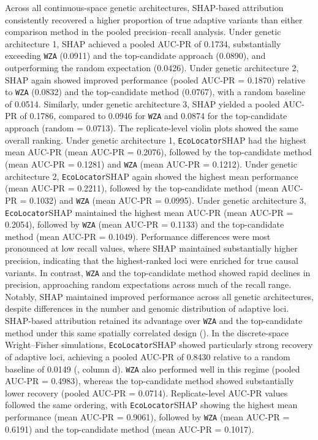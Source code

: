 \documentclass[]{article}
\newcommand{\ecolocator}{\texttt{EcoLocator}\xspace}
\begin{document}
Across all continuous-space genetic architectures,
SHAP-based attribution consistently recovered
a higher proportion of true adaptive variants
than either comparison method in the pooled precision--recall analysis.
Under genetic architecture 1,
SHAP achieved a pooled AUC-PR of 0.1734,
substantially exceeding \texttt{WZA} (0.0911)
and the top-candidate approach (0.0890),
and outperforming the random expectation (0.0426).
Under genetic architecture 2,
SHAP again showed improved performance
(pooled AUC-PR = 0.1870)
relative to \texttt{WZA} (0.0832)
and the top-candidate method (0.0767),
with a random baseline of 0.0514.
Similarly,
under genetic architecture 3,
SHAP yielded a pooled AUC-PR of 0.1786,
compared to 0.0946 for \texttt{WZA}
and 0.0874 for the top-candidate approach
(random = 0.0713).
The replicate-level violin plots showed the same overall ranking.
Under genetic architecture 1, 
\ecolocator\texttimes{}SHAP had the highest mean AUC-PR
(mean AUC-PR = 0.2076),
followed by the top-candidate method
(mean AUC-PR = 0.1281)
and \texttt{WZA}
(mean AUC-PR = 0.1212).
Under genetic architecture 2,
\ecolocator\texttimes{}SHAP again showed the highest mean performance
(mean AUC-PR = 0.2211),
followed by the top-candidate method
(mean AUC-PR = 0.1032)
and \texttt{WZA}
(mean AUC-PR = 0.0995).
Under genetic architecture 3,
\ecolocator\texttimes{}SHAP maintained the highest mean AUC-PR
(mean AUC-PR = 0.2054),
followed by \texttt{WZA}
(mean AUC-PR = 0.1133)
and the top-candidate method
(mean AUC-PR = 0.1049).
Performance differences were most pronounced
at low recall values,
where SHAP maintained substantially higher precision,
indicating that the highest-ranked loci
were enriched for true causal variants.
In contrast,
\texttt{WZA} and the top-candidate method showed rapid declines in precision,
approaching random expectations across much of the recall range.
Notably,
SHAP maintained improved performance
across all genetic architectures,
despite differences in the number
and genomic distribution of adaptive loci.
SHAP-based attribution retained its 
advantage over \texttt{WZA} and the top-candidate method under 
this same spatially correlated design ().
In the discrete-space Wright--Fisher simulations,
\ecolocator\texttimes{}SHAP showed particularly strong recovery
of adaptive loci,
achieving a pooled AUC-PR of 0.8430
relative to a random baseline of 0.0149
(, column d).
\texttt{WZA} also performed well in this regime
(pooled AUC-PR = 0.4983),
whereas the top-candidate method showed substantially lower recovery
(pooled AUC-PR = 0.0714).
Replicate-level AUC-PR values followed the same ordering,
with \ecolocator\texttimes{}SHAP showing the highest mean performance
(mean AUC-PR = 0.9061),
followed by \texttt{WZA}
(mean AUC-PR = 0.6191)
and the top-candidate method
(mean AUC-PR = 0.1017).
\end{document}
